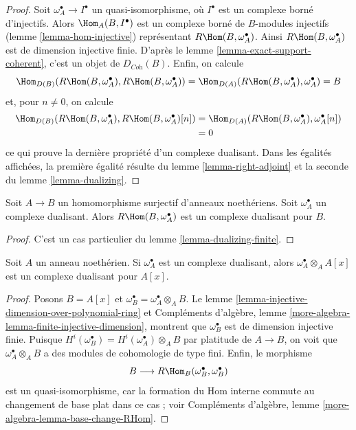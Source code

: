 \begin{proof}
Soit $\omega_A^\bullet \to I^\bullet$ un quasi-isomorphisme, où $I^\bullet$ est un complexe borné d'injectifs.
Alors $\Hom_A(B, I^\bullet)$ est un complexe borné de $B$-modules injectifs
(lemme \ref{lemma-hom-injective}) représentant $R\Hom(B, \omega_A^\bullet)$.
Ainsi $R\Hom(B, \omega_A^\bullet)$ est de dimension injective finie.
D'après le lemme \ref{lemma-exact-support-coherent}, c'est un objet de $D_{\textit{Coh}}(B)$.
Enfin, on calcule
$$
\Hom_{D(B)}(R\Hom(B, \omega_A^\bullet), R\Hom(B, \omega_A^\bullet)) =
\Hom_{D(A)}(R\Hom(B, \omega_A^\bullet), \omega_A^\bullet) = B
$$
et, pour $n \not = 0$, on calcule
\begin{align*}
\Hom_{D(B)}(R\Hom(B, \omega_A^\bullet), R\Hom(B, \omega_A^\bullet)[n])
&= \Hom_{D(A)}(R\Hom(B, \omega_A^\bullet), \omega_A^\bullet[n]) \\
&= 0
\end{align*}
ce qui prouve la dernière propriété d'un complexe dualisant.
Dans les égalités affichées, la première égalité résulte du lemme \ref{lemma-right-adjoint}
et la seconde du lemme \ref{lemma-dualizing}.
\end{proof}

\begin{lemma}
\label{lemma-dualizing-quotient}
Soit $A \to B$ un homomorphisme surjectif d'anneaux noethériens.
Soit $\omega_A^\bullet$ un complexe dualisant.
Alors $R\Hom(B, \omega_A^\bullet)$ est un complexe dualisant pour $B$.
\end{lemma}

\begin{proof}
C'est un cas particulier du lemme \ref{lemma-dualizing-finite}.
\end{proof}

\begin{lemma}
\label{lemma-dualizing-polynomial-ring}
Soit $A$ un anneau noethérien. Si $\omega_A^\bullet$ est un complexe dualisant,
alors $\omega_A^\bullet \otimes_A A[x]$ est un complexe dualisant pour $A[x]$.
\end{lemma}

\begin{proof}
Posons $B = A[x]$ et $\omega_B^\bullet = \omega_A^\bullet \otimes_A B$.
Le lemme \ref{lemma-injective-dimension-over-polynomial-ring} et Compléments d'algèbre, lemme \ref{more-algebra-lemma-finite-injective-dimension},
montrent que $\omega_B^\bullet$ est de dimension injective finie.
Puisque $H^i(\omega_B^\bullet) = H^i(\omega_A^\bullet) \otimes_A B$ par platitude de $A \to B$, on voit que $\omega_A^\bullet \otimes_A B$
a des modules de cohomologie de type fini.
Enfin, le morphisme
$$
B \longrightarrow R\Hom_B(\omega_B^\bullet, \omega_B^\bullet)
$$
est un quasi-isomorphisme, car la formation du Hom interne commute
au changement de base plat dans ce cas ; voir
Compléments d'algèbre, lemme \ref{more-algebra-lemma-base-change-RHom}.
\end{proof}

